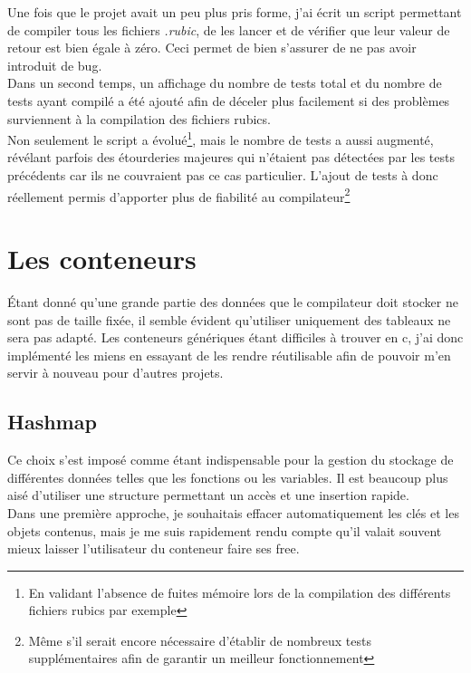 \documentclass[12pt]{article}
\begin{document}
Une fois que le projet avait un peu plus pris forme, j'ai écrit un script
permettant de compiler tous les fichiers {\em.rubic}, de les lancer et de
vérifier que leur valeur de retour est bien égale à zéro. Ceci permet de bien
s'assurer de ne pas avoir introduit de bug.\\

Dans un second temps, un affichage du nombre de tests total et du nombre de
tests ayant compilé a été ajouté afin de déceler plus facilement si des
problèmes surviennent à la compilation des fichiers rubics.\\

Non seulement le script a évolué\footnote{En validant l'absence de fuites
mémoire lors de la compilation des différents fichiers rubics par exemple},
mais le nombre de tests a aussi augmenté, révélant parfois des étourderies
majeures qui n'étaient pas détectées par les tests précédents car ils ne
couvraient pas ce cas particulier. L'ajout de tests à donc réellement permis
d'apporter plus de fiabilité au compilateur\footnote{Même s'il serait encore
nécessaire d'établir de nombreux tests supplémentaires afin de garantir un
meilleur fonctionnement}

\section{Les conteneurs}

Étant donné qu'une grande partie des données que le compilateur doit stocker
ne sont pas de taille fixée, il semble évident qu'utiliser uniquement des
tableaux ne sera pas adapté. Les conteneurs génériques étant difficiles à
trouver en c, j'ai donc implémenté les miens en essayant de les rendre
réutilisable afin de pouvoir m'en servir à nouveau pour d'autres projets.

\subsection{Hashmap}
Ce choix s'est imposé comme étant indispensable pour la gestion du stockage
de différentes données telles que les fonctions ou les variables. Il est
beaucoup plus aisé d'utiliser une structure permettant un accès et une
insertion rapide.\\

Dans une première approche, je souhaitais effacer automatiquement les clés et
les objets contenus, mais je me suis rapidement rendu compte qu'il valait
souvent mieux laisser l'utilisateur du conteneur faire ses free.\\
\end{document}

